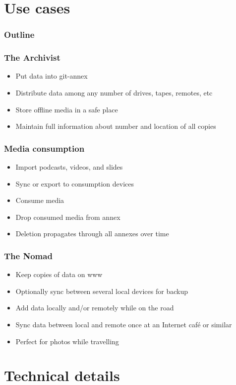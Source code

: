 \documentclass[t]{beamer}
\begin{document}
\section{Use cases}

\begin{frame}
	\frametitle{Outline}
	\tableofcontents[currentsection]
\end{frame}

\begin{frame}
	\frametitle{The Archivist}
	\begin{itemize}
		\item Put data into git-annex
		\item Distribute data among any number of drives, tapes, remotes, etc
		\item Store offline media in a safe place
		\item Maintain full information about number and location of all copies
	\end{itemize}
\end{frame}

\begin{frame}
	\frametitle{Media consumption}
	\begin{itemize}
		\item Import podcasts, videos, and slides
		\item Sync or export to consumption devices
		\item Consume media
		\item Drop consumed media from annex
		\item Deletion propagates through all annexes over time
	\end{itemize}
\end{frame}

\begin{frame}
	\frametitle{The Nomad}
	\begin{itemize}
		\item Keep copies of data on www
		\item Optionally sync between several local devices for backup
		\item Add data locally and/or remotely while on the road
		\item Sync data between local and remote once at an Internet café or similar
		\item Perfect for photos while travelling
	\end{itemize}
\end{frame}


\section{Technical details}
\end{document}
